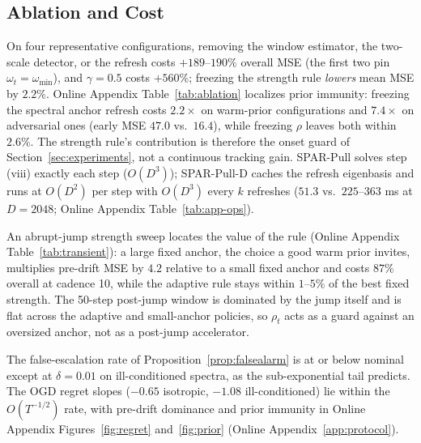 \documentclass[twoside,11pt]{article}
\begin{document}
\subsection{Ablation and Cost}
\label{sec:bridges}
On four representative configurations, removing the window estimator, the two-scale detector, or the refresh costs $+189$--$190\%$ overall MSE (the first two pin $\omega_t = \omega_{\min}$), and $\gamma = 0.5$ costs $+560\%$; freezing the strength rule \emph{lowers} mean MSE by $2.2\%$.
Online Appendix Table~\ref{tab:ablation} localizes prior immunity: freezing the spectral anchor refresh costs $2.2\times$ on warm-prior configurations and $7.4\times$ on adversarial ones (early MSE $47.0$ vs.\ $16.4$), while freezing $\rho$ leaves both within $2.6\%$.
The strength rule's contribution is therefore the onset guard of Section~\ref{sec:experiments}, not a continuous tracking gain.
SPAR-Pull solves step (viii) exactly each step ($O(D^3)$); SPAR-Pull-D caches the refresh eigenbasis and runs at $O(D^2)$ per step with $O(D^3)$ every $k$ refreshes ($51.3$ vs.\ $225$--$363$ ms at $D = 2048$; Online Appendix Table~\ref{tab:app-ops}).

An abrupt-jump strength sweep locates the value of the rule (Online Appendix Table~\ref{tab:transient}): a large fixed anchor, the choice a good warm prior invites, multiplies pre-drift MSE by $4.2$ relative to a small fixed anchor and costs $87\%$ overall at cadence 10, while the adaptive rule stays within $1$--$5\%$ of the best fixed strength.
The 50-step post-jump window is dominated by the jump itself and is flat across the adaptive and small-anchor policies, so $\rho_t$ acts as a guard against an oversized anchor, not as a post-jump accelerator.

The false-escalation rate of Proposition~\ref{prop:falsealarm} is at or below nominal except at $\delta = 0.01$ on ill-conditioned spectra, as the sub-exponential tail predicts.
The OGD regret slopes ($-0.65$ isotropic, $-1.08$ ill-conditioned) lie within the $O(T^{-1/2})$ rate, with pre-drift dominance and prior immunity in Online Appendix Figures~\ref{fig:regret} and~\ref{fig:prior} (Online Appendix~\ref{app:protocol}).
\end{document}
